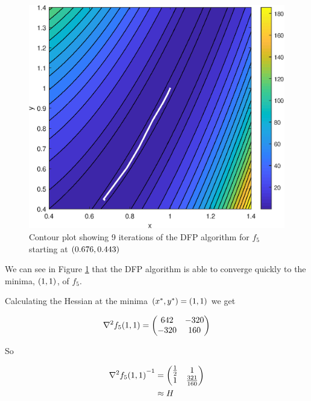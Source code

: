 \documentclass[11pt]{article} %
\let\originalleft\left
\let\originalright\right
\renewcommand{\left}{\mathopen{}\mathclose\bgroup\originalleft}
\renewcommand{\right}{\aftergroup\egroup\originalright}
\begin{document}
\begin{figure}[!h]
	\centering
	\includegraphics{"../Matlab Files/contour8"}
	\caption{Contour plot showing 9 iterations of the DFP algorithm for $f_5$ starting at $\left(0.676, 0.443\right)$}
	\label{fig:DFP_f5}
\end{figure}

We can see in Figure \ref{fig:DFP_f5} that the DFP algorithm is able to converge quickly to the minima, $\left(1,1\right)$, of $f_5$.

Calculating the Hessian at the minima $\left(x^*, y^* \right) = \left(1, 1 \right)$ we get

\begin{equation*}
	\nabla^2 f_5\left(1, 1 \right) =
	\begin{pmatrix}
		642  & -320 \\
		-320 & 160
	\end{pmatrix}
\end{equation*}

So

\begin{align*}
	{\nabla^2 f_5\left(1, 1 \right)}^{-1} = {} & 
	\begin{pmatrix}
		\frac{1}{2} & 1    \\
		1                & \frac{321}{160}
	\end{pmatrix} \\
	\approx {} & H\\
\end{align*}
\end{document}
